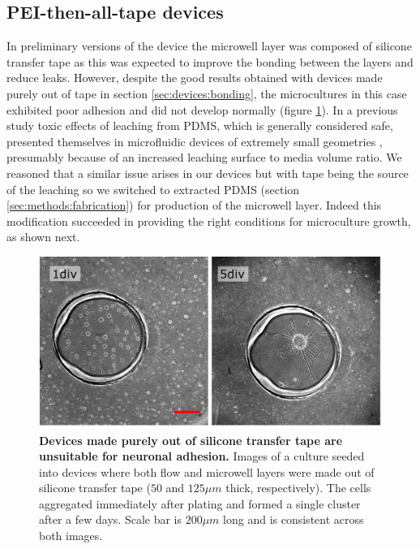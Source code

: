 \subsection{PEI-then-all-tape devices}
    In preliminary versions of the device the microwell layer was composed of silicone transfer tape as this was expected to improve the bonding between the layers and reduce leaks. However, despite the good results obtained with devices made purely out of tape in section \ref{sec:devices:bonding}, the microcultures in this case exhibited poor adhesion and did not develop normally (figure \ref{fig:pulses:tapeMicroculture}). In a previous study toxic effects of leaching from PDMS, which is generally considered safe, presented themselves in microfluidic devices of extremely small geometries \cite{millet2007microfluidic}, presumably because of an increased leaching surface to media volume ratio. We reasoned that a similar issue arises in our devices but with tape being the source of the leaching so we switched to extracted PDMS (section \ref{sec:methods:fabrication}) for production of the microwell layer. Indeed this modification succeeded in providing the right conditions for microculture growth, as shown next.

  \begin{figure}[h]
       \centering
       \includegraphics[width=15cm]{chapter6/figures/tapeMicroculture/tapeMicroculture.jpg}
       \caption[Microcultures grown in all-tape devices exhibit bad surface adhesion]{\textbf{Devices made purely out of silicone transfer tape are unsuitable for neuronal adhesion.} Images of a culture seeded into devices where both flow and microwell layers were made out of silicone transfer tape (\(50\) and \(125 \mu m\) thick, respectively). The cells aggregated immediately after plating and formed a single cluster after a few days. Scale bar is \(200 \mu m\) long and is consistent across both images.}
       \label{fig:pulses:tapeMicroculture}
  \end{figure}

